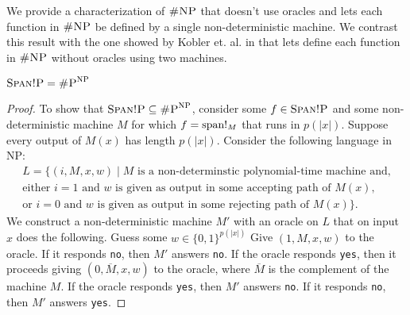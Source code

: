 We provide a characterization of $\shnp$ that doesn't use oracles and lets each function in $\shnp$ be defined by a single non-deterministic machine. We contrast this result with the one showed by Kobler et. al. in \cite{DBLP:journals/acta/KoblerST89} that lets define each function in $\shnp$ without oracles using two machines.

\begin{theo}
	$\stspanp = \shp^{\np}$
\end{theo}
\begin{proof}
	To show that $\stspanp \subseteq \shp^{\np}$, consider some $f \in \stspanp$ and some non-deterministic machine $M$ for which $f = \sp!_M$ that runs in $p(\vert x\vert)$. Suppose every output of $M(x)$ has length $p(\vert x\vert)$. Consider the following language in NP:
	\begin{multline*}
		L = \{ (i,M,x,w) \mid M \text{ is a non-determinstic polynomial-time machine and,} \\ \text{either $i = 1$ and $w$ is given as output in some accepting path of $M(x)$}, \\ \text{or $i = 0$ and $w$ is given as output in some rejecting path of $M(x)$}\}.
	\end{multline*}
	 We construct a non-deterministic machine $M'$ with an oracle on $L$ that on input $x$ does the following. Guess some $w\in\{0,1\}^{p(\vert x\vert)}$ Give $(1,M,x,w)$ to the oracle. If it responds {\tt no}, then $M'$ answers {\tt no}. If the oracle responds {\tt yes}, then it proceeds giving $(0,\overline{M},x,w)$ to the oracle, where $\overline{M}$ is the complement of the machine $M$. If the oracle responds {\tt yes}, then $M'$ answers {\tt no}. If it responds {\tt no}, then $M'$ answers {\tt yes}.
	 

\end{proof}
